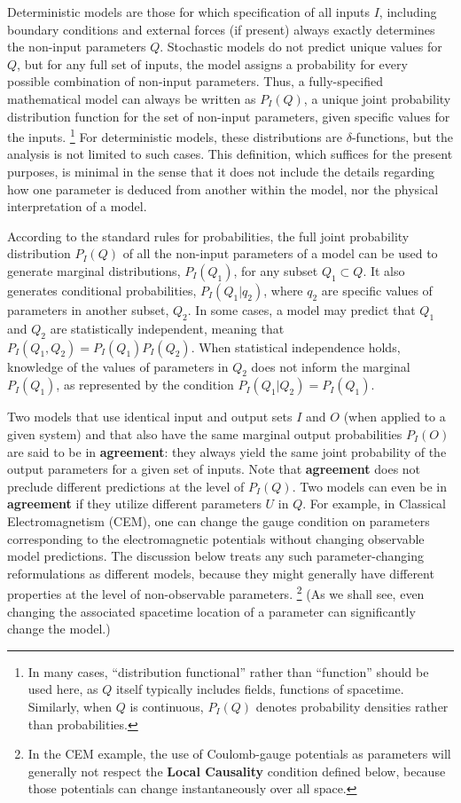 \documentclass[onecolumn, nofootinbib, 12pt]{revtex4-1}
\begin{document}
Deterministic models are those for which specification of all inputs $I$, including boundary conditions and external forces (if present) always exactly determines the non-input parameters $Q$.  Stochastic models do not predict unique values for $Q$, but for any full set of inputs, the model assigns a probability for every possible combination of non-input parameters.  Thus, a fully-specified mathematical model can always be written as $P_I(Q)$, a unique joint probability distribution function for the set of non-input parameters, given specific values for the inputs.%
\footnote{In many cases, ``distribution functional'' rather than ``function'' should be used here, as $Q$ itself typically includes fields, functions of spacetime.  Similarly, when $Q$ is continuous, $P_I(Q)$ denotes probability densities rather than probabilities.}
For deterministic models, these distributions are $\delta$-functions, but the analysis is not limited to such cases.  This definition, which suffices for the present purposes, is minimal in the sense that it does not include the details regarding how one parameter is deduced from another within the model, nor the physical interpretation of a model.
 
According to the standard rules for probabilities, the full joint probability distribution $P_I(Q)$ of all the non-input parameters of a model can be used to generate marginal distributions, $P_I(Q_1)$, for any subset $Q_1 \subset Q$.  It also generates conditional probabilities, $P_I(Q_1|q_2)$, where $q_2$ are specific values of parameters in another subset, $Q_2$.  In some cases, a model may predict that $Q_1$ and $Q_2$ are statistically independent, meaning that $P_I(Q_1,Q_2) = P_I(Q_1) P_I(Q_2)$.  When statistical independence holds, knowledge of the values of parameters in $Q_2$ does not inform the marginal $P_I(Q_1)$, as represented by the condition $P_{I}(Q_1|Q_2)=P_{I}(Q_1)$.

Two models that use identical input and output sets $I$ and $O$ (when applied to a given system) and that also have the same marginal output probabilities $P_I(O)$ are said to be in {\bf agreement}: they always yield the same joint probability of the output parameters for a given set of inputs.  Note that {\bf agreement} does not preclude different predictions at the level of $P_I(Q)$.  Two models can even be in {\bf agreement} if they utilize different parameters $U$ in $Q$.  For example, in Classical Electromagnetism (CEM), one can change the gauge condition on parameters corresponding to the electromagnetic potentials without changing observable model predictions.  The discussion below treats any such parameter-changing reformulations as different models, because they might generally have different properties at the level of non-observable parameters.%
\footnote{In the CEM example, the use of Coulomb-gauge potentials as parameters will generally not respect the {\bf Local Causality} condition defined below, because those potentials can change instantaneously over all space.}
(As we shall see, even changing the associated spacetime location of a parameter can significantly change the model.)
\end{document}
